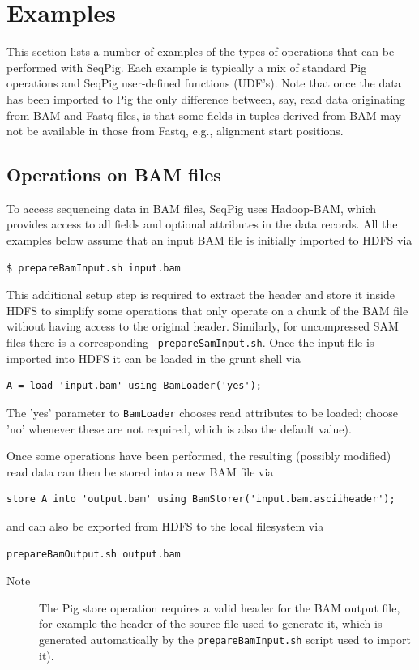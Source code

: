 
\section{Examples}
\label{sect:examples}

This section lists a number of examples of the types of operations
that can be performed with SeqPig. Each example is typically a mix of
standard Pig operations and SeqPig user-defined functions (UDF's).
Note that once the data has been imported to Pig the only difference
between, say, read data originating from BAM and Fastq files, is that
some fields in tuples derived from BAM may not be available in those
from Fastq, e.g., alignment start positions.

\subsection{Operations on BAM files}

\label{sect:examples:bam}

To access sequencing data in BAM files, SeqPig uses Hadoop-BAM, which
provides access to all fields and optional attributes in the data
records. All the examples below assume that an input BAM file is
initially imported to HDFS via
\begin{lstlisting} 
$ prepareBamInput.sh input.bam
\end{lstlisting} 
This additional setup step is required to extract the header and store
it inside HDFS to simplify some operations that only operate on a
chunk of the BAM file without having access to the original header.
Similarly, for uncompressed SAM files there is a corresponding {\tt
prepareSamInput.sh}. Once the input file is imported into HDFS it
can be loaded in the grunt shell via
\begin{lstlisting} 
A = load 'input.bam' using BamLoader('yes');
\end{lstlisting} 
The 'yes' parameter to {\tt BamLoader} chooses read attributes to be
loaded; choose 'no' whenever these are not required, which is
also the default value).

Once some operations have been performed, the resulting (possibly
modified) read data can then be stored into a new BAM file via
\begin{lstlisting}
store A into 'output.bam' using BamStorer('input.bam.asciiheader');
\end{lstlisting}
and can also be exported from HDFS to the local filesystem via
\begin{lstlisting}
prepareBamOutput.sh output.bam
\end{lstlisting}
\begin{description}
	\item[Note] The Pig store operation requires a valid header for the BAM output file,
for example the header of the source file used to generate it, which is
generated automatically by the {\tt prepareBamInput.sh} script used to import it).
\end{description}

